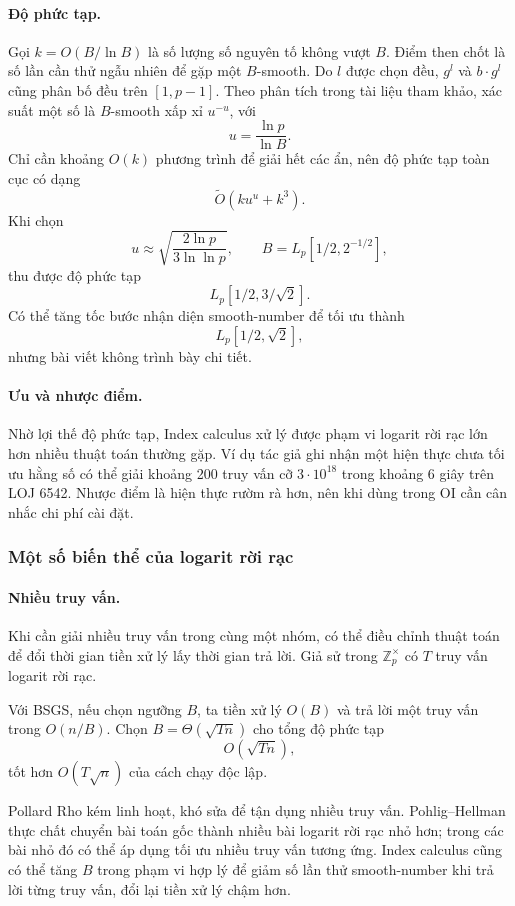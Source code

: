 \documentclass[11pt]{article}
\begin{document}
\paragraph{Độ phức tạp.}
Gọi \(k=O(B/\ln B)\) là số lượng số nguyên tố không vượt \(B\). Điểm then chốt
là số lần cần thử ngẫu nhiên để gặp một \(B\)-smooth. Do \(l\) được chọn đều,
\(g^l\) và \(b\cdot g^l\) cũng phân bố đều trên \([1,p-1]\). Theo phân tích
trong tài liệu tham khảo, xác suất một số là \(B\)-smooth xấp xỉ \(u^{-u}\),
với
\[
  u=\frac{\ln p}{\ln B}.
\]
Chỉ cần khoảng \(O(k)\) phương trình để giải hết các ẩn, nên độ phức tạp toàn
cục có dạng
\[
  \tilde O(k u^u+k^3).
\]
Khi chọn
\[
  u\approx \sqrt{\frac{2\ln p}{3\ln\ln p}},
  \qquad
  B=L_p[1/2,2^{-1/2}],
\]
thu được độ phức tạp
\[
  L_p[1/2,3/\sqrt 2].
\]
Có thể tăng tốc bước nhận diện smooth-number để tối ưu thành
\[
  L_p[1/2,\sqrt 2],
\]
nhưng bài viết không trình bày chi tiết.

\paragraph{Ưu và nhược điểm.}
Nhờ lợi thế độ phức tạp, Index calculus xử lý được phạm vi logarit rời rạc lớn
hơn nhiều thuật toán thường gặp. Ví dụ tác giả ghi nhận một hiện thực chưa tối
ưu hằng số có thể giải khoảng 200 truy vấn cỡ \(3\cdot 10^{18}\) trong khoảng
6 giây trên LOJ 6542. Nhược điểm là hiện thực rườm rà hơn, nên khi dùng trong
OI cần cân nhắc chi phí cài đặt.

\subsubsection{Một số biến thể của logarit rời rạc}

\paragraph{Nhiều truy vấn.}
Khi cần giải nhiều truy vấn trong cùng một nhóm, có thể điều chỉnh thuật toán
để đổi thời gian tiền xử lý lấy thời gian trả lời. Giả sử trong
\(\mathbb Z_p^\times\) có \(T\) truy vấn logarit rời rạc.

Với BSGS, nếu chọn ngưỡng \(B\), ta tiền xử lý \(O(B)\) và trả lời một truy vấn
trong \(O(n/B)\). Chọn \(B=\Theta(\sqrt{Tn})\) cho tổng độ phức tạp
\[
  O(\sqrt{Tn}),
\]
tốt hơn \(O(T\sqrt n)\) của cách chạy độc lập.

Pollard Rho kém linh hoạt, khó sửa để tận dụng nhiều truy vấn. Pohlig--Hellman
thực chất chuyển bài toán gốc thành nhiều bài logarit rời rạc nhỏ hơn; trong
các bài nhỏ đó có thể áp dụng tối ưu nhiều truy vấn tương ứng. Index calculus
cũng có thể tăng \(B\) trong phạm vi hợp lý để giảm số lần thử smooth-number
khi trả lời từng truy vấn, đổi lại tiền xử lý chậm hơn.
\end{document}
